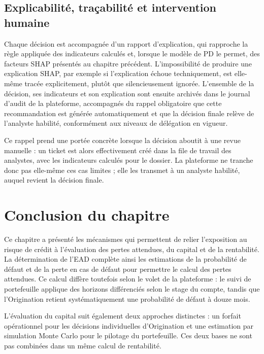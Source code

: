 \subsection{Explicabilité, traçabilité et intervention humaine}

Chaque décision est accompagnée d'un rapport d'explication, qui rapproche la règle appliquée des indicateurs calculés et, lorsque le modèle de PD le permet, des facteurs SHAP présentés au chapitre précédent. L'impossibilité de produire une explication SHAP, par exemple si l'explication échoue techniquement, est elle-même tracée explicitement, plutôt que silencieusement ignorée. L'ensemble de la décision, ses indicateurs et son explication sont ensuite archivés dans le journal d'audit de la plateforme, accompagnés du rappel obligatoire que cette recommandation est générée automatiquement et que la décision finale relève de l'analyste habilité, conformément aux niveaux de délégation en vigueur.

Ce rappel prend une portée concrète lorsque la décision aboutit à une revue manuelle : un ticket est alors effectivement créé dans la file de travail des analystes, avec les indicateurs calculés pour le dossier. La plateforme ne tranche donc pas elle-même ces cas limites ; elle les transmet à un analyste habilité, auquel revient la décision finale.

\section*{Conclusion du chapitre}

Ce chapitre a présenté les mécanismes qui permettent de relier l'exposition au risque de crédit à l'évaluation des pertes attendues, du capital et de la rentabilité. La détermination de l'EAD complète ainsi les estimations de la probabilité de défaut et de la perte en cas de défaut pour permettre le calcul des pertes attendues. Ce calcul diffère toutefois selon le volet de la plateforme : le suivi de portefeuille applique des horizons différenciés selon le stage du compte, tandis que l'Origination retient systématiquement une probabilité de défaut à douze mois.

L'évaluation du capital suit également deux approches distinctes : un forfait opérationnel pour les décisions individuelles d'Origination et une estimation par simulation Monte Carlo pour le pilotage du portefeuille. Ces deux bases ne sont pas combinées dans un même calcul de rentabilité.

